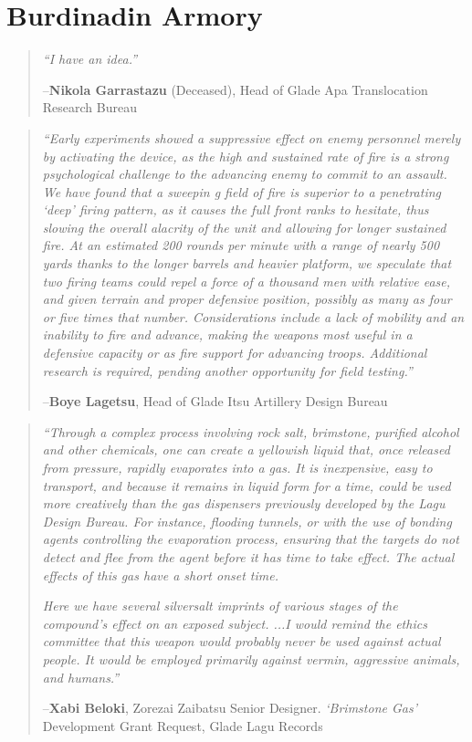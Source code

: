 \documentclass[oneside,11pt,english]{book}
\begin{document}
\chapter{Burdinadin Armory}\label{ch:Burdinadin Armory}
\startcontents[chapters]
\clearpage
\begin{quote}
	
	\emph{“I have an idea.”}\par
		\hfill --\textbf{Nikola Garrastazu} (Deceased), Head of Glade Apa Translocation Research Bureau
\end{quote}
\begin{quote}
	\emph{“Early experiments showed a suppressive effect on enemy personnel merely by activating the device, as the high and sustained 
rate of fire is a strong psychological challenge to the advancing enemy to commit to an assault. We have found that a sweepin g 
field of fire is superior to a penetrating ‘deep’ firing pattern, as it causes the full front ranks to hesitate, thus slowing the overall 
alacrity of the unit and allowing for longer sustained fire. At an estimated 200 rounds per minute with a range of nearly 500 
yards thanks to the longer barrels and heavier platform, we speculate that two firing teams could repel a force of a thousand men 
with relative ease, and given terrain and proper defensive position, possibly as many as four or five times that number. 
Considerations include a lack of mobility and an inability to fire and advance, making the weapons most useful in a defensive 
capacity or as fire support for advancing troops. Additional research is required, pending another opportunity for field testing.”}\par
	\hfill --\textbf{Boye Lagetsu}, Head of Glade Itsu Artillery Design Bureau 
\end{quote}
\begin{quote}
\emph{“Through a complex process involving rock salt, brimstone, purified alcohol and other chemicals, one can create a yellowish 
liquid that, once released from pressure, rapidly evaporates into a gas. It is inexpensive, easy to transport, and because it 
remains in liquid form for a time, could be used more creatively than the gas dispensers previously developed by the Lagu Design 
Bureau. For instance, flooding tunnels, or with the use of bonding agents controlling the evaporation process, ensuring that the 
targets do not detect and flee from the agent before it has time to take effect. The actual effects of this gas have a short onset time.}

\emph{Here we have several silversalt imprints of various stages of the compound’s effect on an exposed subject. 
...I would remind the ethics committee that this weapon would probably never be used against actual people. It would be 
employed primarily against vermin, aggressive animals, and humans.”}\par
--\textbf{Xabi Beloki}, Zorezai Zaibatsu Senior Designer. \textit{‘Brimstone Gas’} Development Grant Request, Glade Lagu Records 
\end{quote}
\end{document}
